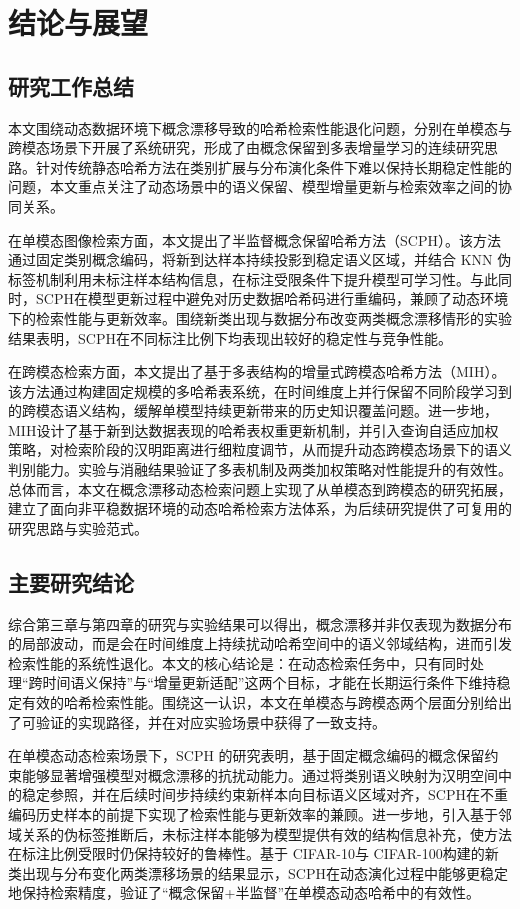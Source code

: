 \chapter{结论与展望}

\section{研究工作总结}
本文围绕动态数据环境下概念漂移导致的哈希检索性能退化问题，分别在单模态与跨模态场景下开展了系统研究，形成了由概念保留到多表增量学习的连续研究思路。针对传统静态哈希方法在类别扩展与分布演化条件下难以保持长期稳定性能的问题，本文重点关注了动态场景中的语义保留、模型增量更新与检索效率之间的协同关系。

在单模态图像检索方面，本文提出了半监督概念保留哈希方法（SCPH）。该方法通过固定类别概念编码，将新到达样本持续投影到稳定语义区域，并结合 KNN 伪标签机制利用未标注样本结构信息，在标注受限条件下提升模型可学习性。与此同时，SCPH在模型更新过程中避免对历史数据哈希码进行重编码，兼顾了动态环境下的检索性能与更新效率。围绕新类出现与数据分布改变两类概念漂移情形的实验结果表明，SCPH在不同标注比例下均表现出较好的稳定性与竞争性能。

在跨模态检索方面，本文提出了基于多表结构的增量式跨模态哈希方法（MIH）。该方法通过构建固定规模的多哈希表系统，在时间维度上并行保留不同阶段学习到的跨模态语义结构，缓解单模型持续更新带来的历史知识覆盖问题。进一步地，MIH设计了基于新到达数据表现的哈希表权重更新机制，并引入查询自适应加权策略，对检索阶段的汉明距离进行细粒度调节，从而提升动态跨模态场景下的语义判别能力。实验与消融结果验证了多表机制及两类加权策略对性能提升的有效性。
总体而言，本文在概念漂移动态检索问题上实现了从单模态到跨模态的研究拓展，建立了面向非平稳数据环境的动态哈希检索方法体系，为后续研究提供了可复用的研究思路与实验范式。

\section{主要研究结论}
综合第三章与第四章的研究与实验结果可以得出，概念漂移并非仅表现为数据分布的局部波动，而是会在时间维度上持续扰动哈希空间中的语义邻域结构，进而引发检索性能的系统性退化。本文的核心结论是：在动态检索任务中，只有同时处理“跨时间语义保持”与“增量更新适配”这两个目标，才能在长期运行条件下维持稳定有效的哈希检索性能。围绕这一认识，本文在单模态与跨模态两个层面分别给出了可验证的实现路径，并在对应实验场景中获得了一致支持。

在单模态动态检索场景下，SCPH 的研究表明，基于固定概念编码的概念保留约束能够显著增强模型对概念漂移的抗扰动能力。通过将类别语义映射为汉明空间中的稳定参照，并在后续时间步持续约束新样本向目标语义区域对齐，SCPH在不重编码历史样本的前提下实现了检索性能与更新效率的兼顾。进一步地，引入基于邻域关系的伪标签推断后，未标注样本能够为模型提供有效的结构信息补充，使方法在标注比例受限时仍保持较好的鲁棒性。基于 CIFAR-10与 CIFAR-100构建的新类出现与分布变化两类漂移场景的结果显示，SCPH在动态演化过程中能够更稳定地保持检索精度，验证了“概念保留+半监督”在单模态动态哈希中的有效性。

